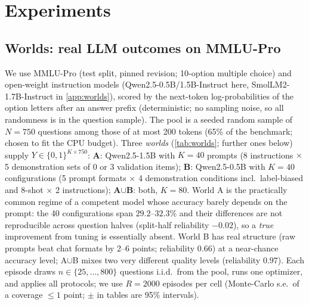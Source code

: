 \section{Experiments}
\label{sec:exp}
\subsection{Worlds: real LLM outcomes on MMLU-Pro}
We use MMLU-Pro \citep{wang2024mmlupro} (test split, pinned revision; 10-option multiple choice) and open-weight instruction models (Qwen2.5-0.5B/1.5B-Instruct \citep{qwen2025qwen25} here, SmolLM2-1.7B-Instruct in \cref{app:worlds}), scored by the next-token log-probabilities of the option letters after an answer prefix (deterministic; no sampling noise, so all randomness is in the question sample). The pool is a seeded random sample of $N{=}750$ questions among those of at most 200 tokens (65\% of the benchmark; chosen to fit the CPU budget). Three \emph{worlds} (\cref{tab:worlds}; further ones below) supply $Y\in\{0,1\}^{K\times 750}$: \textbf{A}: Qwen2.5-1.5B with $K{=}40$ prompts (8 instructions $\times$ 5 demonstration sets of 0 or 3 validation items); \textbf{B}: Qwen2.5-0.5B with $K{=}40$ configurations (5 prompt formats $\times$ 4 demonstration conditions incl.\ label-biased and 8-shot $\times$ 2 instructions); \textbf{A$\cup$B}: both, $K{=}80$. World A is the practically common regime of a competent model whose accuracy barely depends on the prompt: the 40 configurations span $29.2$--$32.3\%$ and their differences are not reproducible across question halves (split-half reliability $-0.02$), so a \emph{true} improvement from tuning is essentially absent. World B has real structure (raw prompts beat chat formats by 2--6 points; reliability $0.66$) at a near-chance accuracy level; A$\cup$B mixes two very different quality levels (reliability $0.97$). Each episode draws $n\in\{25,\dots,800\}$ questions i.i.d.\ from the pool, runs one optimizer, and applies all protocols; we use $R{=}2000$ episodes per cell (Monte-Carlo s.e.\ of a coverage $\le1$ point; $\pm$ in tables are 95\% intervals).
\begin{table}[t]
\caption{Worlds. Accuracy in \%; sd = standard deviation of true configuration accuracies (points); $\bar\rho$ = mean pairwise correlation of per-question outcomes between configurations; reliability = correlation of configuration accuracies between two random question halves.}\label{tab:worlds}
\centering\scriptsize\setlength{\tabcolsep}{3pt}

\end{table}

